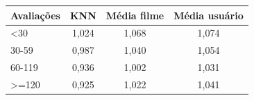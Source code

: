 \begin{tabular}{lccc}
\hline
Avalia\c{c}\~oes & KNN & M\'edia filme & M\'edia usu\'ario \\
\hline
<30 & 1,024 & 1,068 & 1,074 \\
30-59 & 0,987 & 1,040 & 1,054 \\
60-119 & 0,936 & 1,002 & 1,031 \\
>=120 & 0,925 & 1,022 & 1,041 \\
\hline
\end{tabular}
